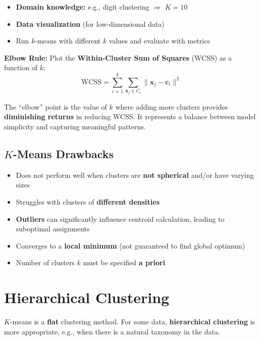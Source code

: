 \documentclass[11pt,a4paper]{article}
\theoremstyle{definition}
\theoremstyle{plain}
\theoremstyle{remark}
\begin{document}
\begin{itemize}
    \item \textbf{Domain knowledge:} e.g., digit clustering $\Rightarrow$ $K = 10$
    \item \textbf{Data visualization} (for low-dimensional data)
    \item Run $k$-means with different $k$ values and evaluate with metrics
\end{itemize}

\textbf{Elbow Rule:} Plot the \textbf{Within-Cluster Sum of Squares} (WCSS) as a function of $k$:
\[
\text{WCSS} = \sum_{i=1}^{k} \sum_{\mathbf{x}_j \in C_i} \|\mathbf{x}_j - \mathbf{c}_i\|^2
\]

The ``elbow'' point is the value of $k$ where adding more clusters provides \textbf{diminishing returns} in reducing WCSS. It represents a balance between model simplicity and capturing meaningful patterns.

\subsection{$K$-Means Drawbacks}

\begin{tcolorbox}[colback=red!5!white,colframe=red!75!black,title=\textbf{$K$-Means Drawbacks}]
\begin{itemize}
    \item Does not perform well when clusters are \textbf{not spherical} and/or have varying sizes
    \item Struggles with clusters of \textbf{different densities}
    \item \textbf{Outliers} can significantly influence centroid calculation, leading to suboptimal assignments
    \item Converges to a \textbf{local minimum} (not guaranteed to find global optimum)
    \item Number of clusters $k$ must be specified \textbf{a priori}
\end{itemize}
\end{tcolorbox}


\section{Hierarchical Clustering}

$K$-means is a \textbf{flat} clustering method. For some data, \textbf{hierarchical clustering} is more appropriate, e.g., when there is a natural taxonomy in the data.
\end{document}

